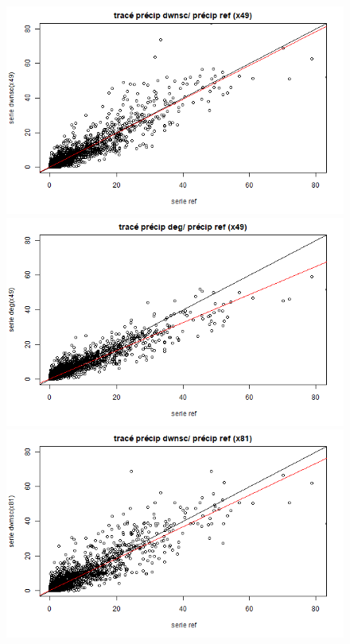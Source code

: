 \documentclass[a4paper,11pt]{article}
\begin{document}
\begin{figure}
	\begin{minipage}[b]{0.48\linewidth}
		\centering \includegraphics[scale=0.4]{images/pr_3_ds.png}
	\end{minipage}\hfill
	\begin{minipage}[b]{0.48\linewidth}	
		\centering \includegraphics[scale=0.4]{images/pr_3_dg.png}
	\end{minipage}
	\begin{minipage}[b]{0.48\linewidth}
		\centering \includegraphics[scale=0.4]{images/pr_4_ds.png}

\end{minipage}
\end{figure}
\end{document}

